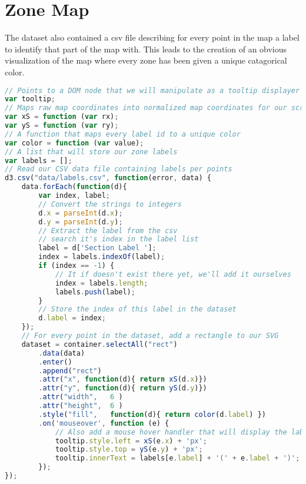 \section{Zone Map}
The dataset also contained a csv file describing for every point in the map a label to identify that part of the map with. This leads to the creation of an obvious visualization of the map where every zone has been given a unique catagorical color.

\begin{lstlisting}[language=JavaScript]
// Points to a DOM node that we will manipulate as a tooltip displayer
var tooltip;
// Maps raw map coordinates into normalized map coordinates for our screen
var xS = function (var rx);
var yS = function (var ry);
// A function that maps every label id to a unique color
var color = function (var value);
// A list that will store our zone labels
var labels = [];
// Read our CSV data file containing labels per points
d3.csv("data/labels.csv", function(error, data) {
    data.forEach(function(d){
        var index, label;
        // Convert the strings to integers
        d.x = parseInt(d.x);
        d.y = parseInt(d.y);
        // Extract the label from the csv
        // search it's index in the label list
        label = d['Section Label '];
        index = labels.indexOf(label);
        if (index == -1) {
        	// It if doesn't exist there yet, we'll add it ourselves
            index = labels.length;
            labels.push(label);
        }
        // Store the index of this label in the dataset
        d.label = index;
    });
    // For every point in the dataset, add a rectangle to our SVG
    dataset = container.selectAll("rect")
        .data(data)
        .enter()
        .append("rect")
        .attr("x", function(d){ return xS(d.x)})
        .attr("y", function(d){ return yS(d.y)})
        .attr("width",   6 ) 
        .attr("height",  6 )
        .style("fill",   function(d){ return color(d.label) })
        .on('mouseover', function (e) {
        	// Also add a mouse hover handler that will display the label value
            tooltip.style.left = xS(e.x) + 'px';
            tooltip.style.top = yS(e.y) + 'px';
            tooltip.innerText = labels[e.label] + '(' + e.label + ')';
        });
});
\end{lstlisting}
